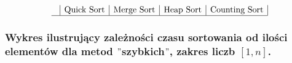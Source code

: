 \documentclass[polish,polish,a4paper]{article}
\begin{document}
\begin{spacing}{1.5}
\begin{figure}[H]
\begin{equation*}
\begin{array}{l|c|c|c|c|}
	&$Quick Sort$&$Merge Sort$&$Heap Sort$&$Counting Sort$\\
	\hline
	\end{array}
	\end{equation*}
\end{figure}

\subsubsection*{Wykres ilustrujący zależności czasu sortowania od ilości elementów dla metod $"$szybkich$"$, zakres liczb $ [1,n] $.}



	
	
\end{spacing}
	\newpage
	\tableofcontents
\end{document}
